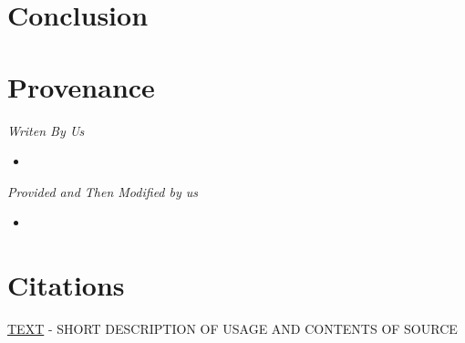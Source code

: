 \documentclass[12pt,a4paper,final]{article}
\begin{document}
\section*{Conclusion}

\section*{Provenance}

\begin{center} \emph{Writen By Us} \end{center}
\begin{itemize}[noitemsep]
    \item
\end{itemize}

\begin{center} \emph{Provided and Then Modified by us} \end{center}
\begin{itemize}[noitemsep]
	\item
\end{itemize}


\section*{Citations}

\noindent
\href{HYPERLINK}{TEXT}
\newline - SHORT DESCRIPTION OF USAGE AND CONTENTS OF SOURCE
\end{document}
